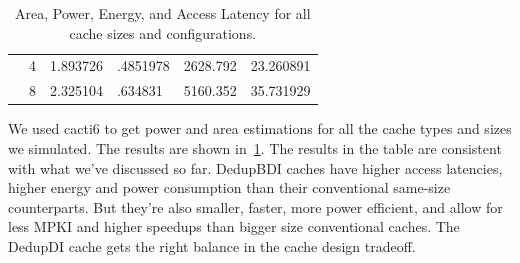 \begin{table}[]
{\begin{tabular}{llllll}
    \multicolumn{1}{c|}{}                          & \multicolumn{1}{l|}{4}   & 1.893726                                                                          & .4851978                                                                               & 2628.792                                                                         & 23.260891                      \\
    \multicolumn{1}{c|}{}                          & \multicolumn{1}{l|}{8}   & 2.325104                                                                          & .634831                                                                                & 5160.352                                                                         & 35.731929                      \\ \cline{1-2}
    \end{tabular}%
    }
    \caption{Area, Power, Energy, and Access Latency for all cache sizes and configurations.}
    \label{tab:areapower}
\end{table}
We used cacti6\cite{cacti} to get power and area estimations for all the cache types and sizes we simulated. The results are shown in~\ref{tab:areapower}. The results in the table are consistent with what we've discussed so far. DedupBDI caches have higher access latencies, higher energy and power consumption than their conventional same-size counterparts. But they're also smaller, faster, more power efficient, and allow for less MPKI and higher speedups than bigger size conventional caches. The DedupDI cache gets the right balance in the cache design tradeoff.